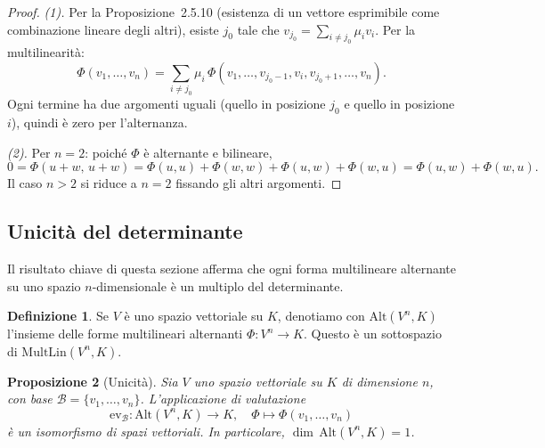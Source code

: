 \documentclass[11pt, a4paper]{book}
\theoremstyle{definition}
\newtheorem{definizione}{Definizione}[section]
\theoremstyle{plain}
\newtheorem{proposizione}[definizione]{Proposizione}
\theoremstyle{remark}
\begin{document}
\begin{proof}
\emph{(1).} Per la Proposizione~2.5.10 (esistenza di un vettore esprimibile come combinazione lineare degli altri), esiste $j_0$ tale che $v_{j_0} = \sum_{i \neq j_0}\mu_i v_i$. Per la multilinearità:
\[
  \Phi(v_1,\ldots,v_n) = \sum_{i \neq j_0}\mu_i\,\Phi(v_1,\ldots,v_{j_0-1},v_i,v_{j_0+1},\ldots,v_n).
\]
Ogni termine ha due argomenti uguali (quello in posizione $j_0$ e quello in posizione $i$), quindi è zero per l'alternanza.

\emph{(2).} Per $n=2$: poiché $\Phi$ è alternante e bilineare,
\[
  0 = \Phi(u+w,\,u+w) = \Phi(u,u)+\Phi(w,w)+\Phi(u,w)+\Phi(w,u) = \Phi(u,w)+\Phi(w,u).
\]
Il caso $n>2$ si riduce a $n=2$ fissando gli altri argomenti.
\end{proof}

\subsection{Unicità del determinante}

Il risultato chiave di questa sezione afferma che ogni forma multilineare alternante su uno spazio $n$-dimensionale è un multiplo del determinante.

\begin{defbox}
\begin{definizione}
Se $V$ è uno spazio vettoriale su $K$, denotiamo con $\mathrm{Alt}(V^n,K)$ l'insieme delle forme multilineari alternanti $\Phi \colon V^n \to K$. Questo è un sottospazio di $\mathrm{MultLin}(V^n,K)$.
\end{definizione}
\end{defbox}

\begin{proposizione}[Unicità]
\label{prop:unicita-det}
Sia $V$ uno spazio vettoriale su $K$ di dimensione $n$, con base $\mathcal{B} = \{v_1,\ldots,v_n\}$. L'applicazione di valutazione
\[
  \mathrm{ev}_{\mathcal{B}} \colon \mathrm{Alt}(V^n,K) \longrightarrow K, \quad \Phi \mapsto \Phi(v_1,\ldots,v_n)
\]
è un isomorfismo di spazi vettoriali. In particolare, $\dim\,\mathrm{Alt}(V^n,K) = 1$.
\end{proposizione}
\end{document}
